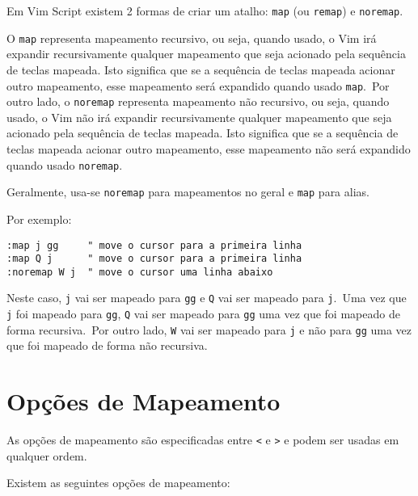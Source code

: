 Em Vim Script existem 2 formas de criar um atalho: \texttt{map} (ou \texttt{remap}) e \texttt{noremap}.

O \texttt{map} representa mapeamento recursivo, ou seja, quando usado, o Vim irá expandir recursivamente qualquer mapeamento que seja acionado pela sequência de teclas mapeada. Isto significa que se a sequência de teclas mapeada acionar outro mapeamento, esse mapeamento será expandido quando usado \texttt{map}.\ Por outro lado, o \texttt{noremap} representa mapeamento não recursivo, ou seja, quando usado, o Vim não irá expandir recursivamente qualquer mapeamento que seja acionado pela sequência de teclas mapeada. Isto significa que se a sequência de teclas mapeada acionar outro mapeamento, esse mapeamento não será expandido quando usado \texttt{noremap}.

Geralmente, usa-se \texttt{noremap} para mapeamentos no geral e \texttt{map} para alias.

Por exemplo:

\begin{lstlisting}
:map j gg     " move o cursor para a primeira linha
:map Q j      " move o cursor para a primeira linha
:noremap W j  " move o cursor uma linha abaixo
\end{lstlisting}

Neste caso, \texttt{j} vai ser mapeado para \texttt{gg} e \texttt{Q} vai ser mapeado para \texttt{j}.\ Uma vez que \texttt{j} foi mapeado para \texttt{gg}, \texttt{Q} vai ser mapeado para \texttt{gg} uma vez que foi mapeado de forma recursiva.\ Por outro lado, \texttt{W} vai ser mapeado para \texttt{j} e não para \texttt{gg} uma vez que foi mapeado de forma não recursiva.

\section{Opções de Mapeamento}
\label{sec:map-extra-options}

As opções de mapeamento são especificadas entre \texttt{<} e \texttt{>} e podem ser usadas em qualquer ordem.

Existem as seguintes opções de mapeamento:


